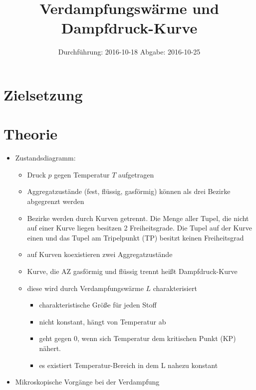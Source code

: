 

\subject{V203}
\title{Verdampfungswärme und Dampfdruck-Kurve}
\date{
	Durchführung: 2016-10-18
	\hspace{3em}
	Abgabe: 2016-10-25
}



\maketitle
\thispagestyle{empty}
\tableofcontents
\newpage

\section{Zielsetzung}

\section{Theorie}

\begin{itemize}
		\item Zustandsdiagramm:
			\begin{itemize}
			\item Druck $p$ gegen Temperatur $T$ aufgetragen
			\item Aggregatzustände (fest, flüssig, gasförmig) können als drei Bezirke abgegrenzt werden
			\item Bezirke werden durch Kurven getrennt.
				Die Menge aller Tupel, die nicht auf einer Kurve liegen besitzen 2 Freiheitsgrade. Die Tupel auf der Kurve einen und das Tupel am Tripelpunkt (TP) besitzt keinen Freiheitsgrad
			\item auf Kurven koexistieren zwei Aggregatzustände
			\item Kurve, die AZ gasförmig und flüssig trennt heißt Dampfdruck-Kurve
			\item diese wird durch Verdampfungswärme $L$ charakterisiert
			\begin{itemize}
					\item charakteristische Größe für jeden Stoff
					\item nicht konstant, hängt von Temperatur ab
					\item geht gegen $0$, wenn sich Temperatur dem kritischen Punkt (KP) nähert.
					\item es existiert Temperatur-Bereich in dem L nahezu konstant
			\end{itemize}
			\end{itemize}
		\item Mikroskopische Vorgänge bei der Verdampfung
\end{itemize}





